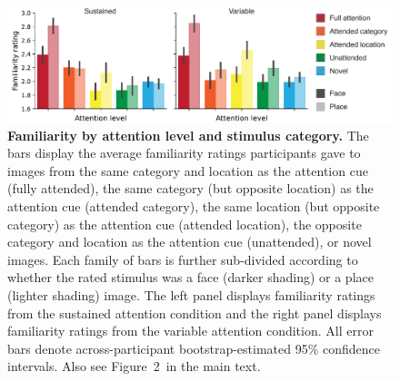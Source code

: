 \documentclass{article}
\newcommand{\familiarity}{2}
\begin{document}
\begin{figure}[tp]
  \centering
  \includegraphics[width=1\textwidth]{figs/familiarity_by_attention_level and_category}

\caption{\textbf{Familiarity by attention level and stimulus category.} The
bars display the average familiarity ratings participants gave to images from
the same category and location as the attention cue (fully attended), the same
category (but opposite location) as the attention cue (attended category), the
same location (but opposite category) as the attention cue (attended location),
the opposite category and location as the attention cue (unattended), or novel
images. Each family of bars is further sub-divided according to whether the
rated stimulus was a face (darker shading) or a place (lighter shading) image.
The left panel displays familiarity ratings from the sustained attention
condition and the right panel displays familiarity ratings from the variable
attention condition. All error bars denote across-participant
bootstrap-estimated 95\% confidence intervals. Also see Figure~\familiarity~in
the main text.}

\label{fig:ratings-by-category}
\end{figure}
\end{document}
